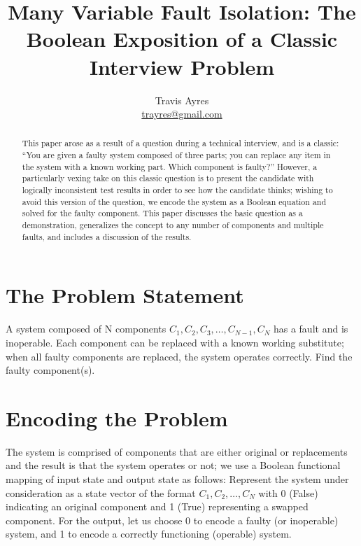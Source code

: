 \documentclass{article}
\begin{document}
\title{Many Variable Fault Isolation: The Boolean Exposition of a Classic Interview Problem}
\author{Travis Ayres \\  \href{mailto:trayres@gmail.com}{trayres@gmail.com}}

\maketitle

\begin{abstract}
	This paper arose as a result of a question during a technical interview, and is a classic: ``You are given a faulty system composed of three parts; you can replace any item in the system with a known working part. Which component is faulty?'' However, a particularly vexing take on this classic question is to present the candidate with logically inconsistent test results in order to see how the candidate thinks; wishing to avoid this version of the question, we encode the system as a Boolean equation and solved for the faulty component. This paper discusses the basic question as a demonstration,  generalizes the concept to any number of components and multiple faults, and includes a discussion of the results. 
\end{abstract}

\section*{The Problem Statement}
	A system composed of N components $C_1, C_2, C_3,\ldots,C_{N-1},C_N$ has a fault and is inoperable. Each component can be replaced with a known working substitute; when all faulty components are replaced, the system operates correctly. Find the faulty component(s).

\section*{Encoding the Problem}
	The system is comprised of components that are either original or replacements and the result is that the system operates or not; we use a Boolean functional mapping of input state and output state as follows:
	Represent the system under consideration as a state vector of the format $C_1,C_2,\ldots,C_N$ with 0 (False) indicating an original component and 1 (True) representing a swapped component. For the output, let us choose 0 to encode a faulty (or inoperable) system, and 1 to encode a correctly functioning (operable) system. 
\end{document}

